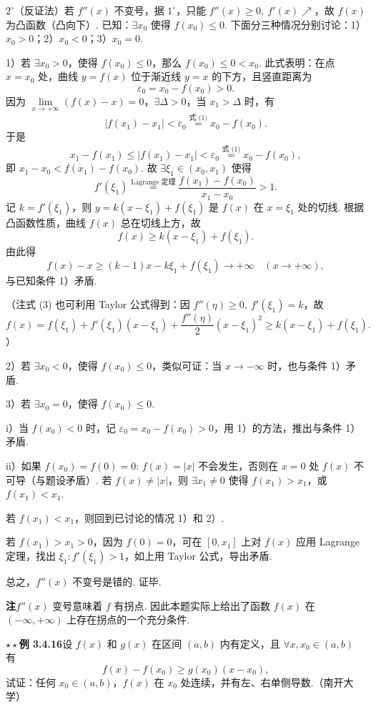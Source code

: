 \documentclass[UTF8, 12pt, fontset=fandol, oneside]{ctexart}
\begin{document}
$2^\circ$（反证法）若 $f''(x)$ 不变号，据 $1^\circ$，只能 $f''(x)\ge0,\ f'(x)\nearrow$，故 $f(x)$ 为凸函数（凸向下）. 已知：$\exists x_0$ 使得 $f(x_0)\le0$. 下面分三种情况分别讨论：1）$x_0>0$；2）$x_0<0$；3）$x_0=0$.

1）若 $\exists x_0>0$，使得 $f(x_0)\le0$，那么 $f(x_0)\le0<x_0$. 此式表明：在点 $x=x_0$ 处，曲线 $y=f(x)$ 位于渐近线 $y=x$ 的下方，且竖直距离为
\[
  \varepsilon_0=x_0-f(x_0)>0. \tag{1}
\]
因为 $\lim\limits_{x\to+\infty}(f(x)-x)=0$，$\exists\Delta>0$，当 $x_1>\Delta$ 时，有
\[
  |f(x_1)-x_1|<\varepsilon_0\overset{\text{式 (1)}}{=}x_0-f(x_0). \tag{2}
\]
于是
\[
  x_1-f(x_1)\le |f(x_1)-x_1|<\varepsilon_0\overset{\text{式 (1)}}{=}x_0-f(x_0),
\]
即 $x_1-x_0<f(x_1)-f(x_0)$. 故 $\exists\xi_1\in(x_0,x_1)$ 使得
\[
  f'(\xi_1)\overset{\text{Lagrange 定理}}{=}\frac{f(x_1)-f(x_0)}{x_1-x_0}>1.
\]
记 $k=f'(\xi_1)$，则 $y=k(x-\xi_1)+f(\xi_1)$ 是 $f(x)$ 在 $x=\xi_1$ 处的切线. 根据凸函数性质，曲线 $f(x)$ 总在切线上方，故
\[
  f(x)\ge k(x-\xi_1)+f(\xi_1). \tag{3}
\]
由此得
\[
  f(x)-x\ge (k-1)x-k\xi_1+f(\xi_1)\to+\infty\quad(x\to+\infty),
\]
与已知条件 1）矛盾.

（注\quad 式 (3) 也可利用 Taylor 公式得到：因 $f''(\eta)\ge0,\ f'(\xi_1)=k$，故
\[
  f(x)=f(\xi_1)+f'(\xi_1)(x-\xi_1)+\frac{f''(\eta)}2(x-\xi_1)^2\ge k(x-\xi_1)+f(\xi_1).
\]
）

2）若 $\exists x_0<0$，使得 $f(x_0)\le0$，类似可证：当 $x\to-\infty$ 时，也与条件 1）矛盾.

3）若 $\exists x_0=0$，使得 $f(x_0)\le0$.

i）当 $f(x_0)<0$ 时，记 $\varepsilon_0=x_0-f(x_0)>0$，用 1）的方法，推出与条件 1）矛盾.

ii）如果 $f(x_0)=f(0)=0$: $f(x)=|x|$ 不会发生，否则在 $x=0$ 处 $f(x)$ 不可导（与题设矛盾）. 若 $f(x)\ne |x|$，则 $\exists x_1\ne0$ 使得 $f(x_1)>x_1$，或 $f(x_1)<x_1$.

若 $f(x_1)<x_1$，则回到已讨论的情况 1）和 2）.

若 $f(x_1)>x_1>0$，因为 $f(0)=0$，可在 $[0,x_1]$ 上对 $f(x)$ 应用 Lagrange 定理，找出 $\xi_1:f'(\xi_1)>1$，如上用 Taylor 公式，导出矛盾.

总之，$f''(x)$ 不变号是错的. 证毕.

\noindent\textbf{注}\quad $f''(x)$ 变号意味着 $f$ 有拐点. 因此本题实际上给出了函数 $f(x)$ 在 $(-\infty,+\infty)$ 上存在拐点的一个充分条件.

\noindent\textbf{$\star\star$例 3.4.16}\quad 设 $f(x)$ 和 $g(x)$ 在区间 $(a,b)$ 内有定义，且 $\forall x,x_0\in(a,b)$ 有
\[
  f(x)-f(x_0)\ge g(x_0)(x-x_0), \tag{1}
\]
试证：任何 $x_0\in(a,b)$，$f(x)$ 在 $x_0$ 处连续，并有左、右单侧导数.（南开大学）
\end{document}
